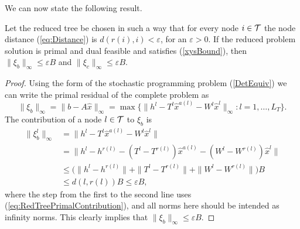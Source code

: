 We can now state the following result.
%
\begin{lemma}  \label{th:BoundResiduals}
Let the reduced tree be chosen in such a way that for every node 
$i \in \mathcal{T}$ the node distance (\ref{eq:Distance}) is 
$d(r(i), i) < \varepsilon$, for an $\varepsilon > 0$.
If the reduced problem solution is primal and dual feasible  
and satisfies (\ref{xysBound}), then
$\| \xi_b \|_{\infty} \leq \varepsilon B$
and  $\| \xi_c \|_{\infty} \leq \varepsilon B$.
\end{lemma} 
%
\begin{proof}
Using the form of the stochastic programming problem (\ref{DetEquiv})
we can write the primal residual of the complete problem as
\[
  \|\xi_b\|_\infty = \|b-A\hat x\|_\infty 
                   = \max\{\|h^{l} - T^{l}\hat x^{a(l)} 
                     - W^{l}\hat x^{l}\|_\infty:l = 1,\ldots,L_T\}.
\]
%
The contribution of a node $l \in \mathcal{T}$ to $\xi_b$ is 
\[
\begin{split}
  \| \xi_b^{l} \|_{\infty}
    & = \|h^{l}\!-\!T^{l}\hat x^{a(l)}\!-\!W^{l}\hat x^{l}\| \\
    & = \|h^{l} \!-\! h^{r(l)} - (T^{l} \!- T^{r(l)})\hat x^{a(l)}
        - (W^{l} - W^{r(l)}) \hat x^{l}\| \\
    & \le \big( \|h^{l} \! - \! h^{r(l)}\| +
           \|T^{l} \! - \! T^{r(l)}\| +
           \|W^{l} \! - \! W^{r(l)}\| \big) B \\
    & \le  d(l, r(l)) B \le \varepsilon B,
\end{split}
\]
where the step from the first to the second line uses 
(\ref{eq:RedTreePrimalContribution}), and all norms here should be
intended as infinity norms.
%
This clearly implies that $\| \xi_b \|_\infty \le \varepsilon B$. 


\end{proof}
